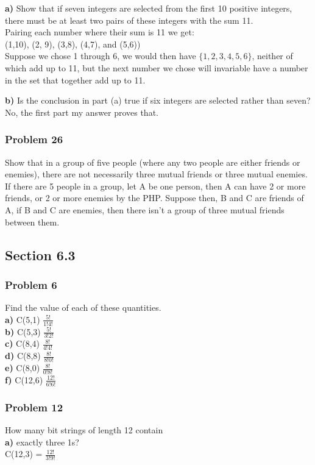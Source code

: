 \documentclass[paper=a4, fontsize=11pt]{scrartcl} %
\begin{document}
\textbf{a)} Show that if seven integers are selected from the first 10 positive integers, there must be at least two pairs of these integers with the sum 11.\\
Pairing each number where their sum is 11 we get:\\
(1,10), (2, 9), (3,8), (4,7), and (5,6))\\ 
Suppose we chose 1 through 6, we would then have $\{1,2,3,4,5,6\}$, neither of which add up to 11, but the next number we chose will invariable have a number in the set that together add up to 11.

\textbf{b)} Is the conclusion in part (a) true if six integers are selected rather than seven?\\

No, the first part my answer proves that.\\
\subsubsection*{Problem 26}
Show that in a group of five people (where any two people are either friends or enemies), there are not necessarily three mutual friends or three mutual enemies.\\
If there are 5 people in a group, let A be one person, then A can have 2 or more friends, or 2 or more enemies by the PHP. Suppose then, B and C are friends of A, if B and C are enemies, then there isn't a group of three mutual friends between them.\\
 
\subsection*{Section 6.3}
\subsubsection*{Problem 6}
Find the value of each of these quantities.\\
\textbf{a)} C(5,1) $\frac{5!}{1!4!}$\\ 
\textbf{b)} C(5,3) $\frac{5!}{3!2!}$\\
\textbf{c)} C(8,4) $\frac{8!}{4!4!}$\\
\textbf{d)} C(8,8) $\frac{8!}{8!0!}$\\
\textbf{e)} C(8,0) $\frac{8!}{0!8!}$\\
\textbf{f)} C(12,6) $\frac{12!}{6!6!}$\\

\subsubsection*{Problem 12}
How many bit strings of length 12 contain\\
\textbf{a)} exactly three 1s? \\
C(12,3) = $\frac{12!}{3!9!}$\\
\end{document}
